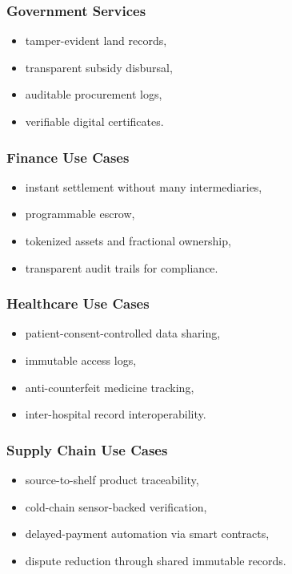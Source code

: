 \documentclass[12pt,a4paper]{article}
\begin{document}
\subsubsection*{Government Services}
\begin{itemize}
\item tamper-evident land records,
\item transparent subsidy disbursal,
\item auditable procurement logs,
\item verifiable digital certificates.
\end{itemize}

\subsubsection*{Finance Use Cases}
\begin{itemize}
\item instant settlement without many intermediaries,
\item programmable escrow,
\item tokenized assets and fractional ownership,
\item transparent audit trails for compliance.
\end{itemize}

\subsubsection*{Healthcare Use Cases}
\begin{itemize}
\item patient-consent-controlled data sharing,
\item immutable access logs,
\item anti-counterfeit medicine tracking,
\item inter-hospital record interoperability.
\end{itemize}

\subsubsection*{Supply Chain Use Cases}
\begin{itemize}
\item source-to-shelf product traceability,
\item cold-chain sensor-backed verification,
\item delayed-payment automation via smart contracts,
\item dispute reduction through shared immutable records.
\end{itemize}
\end{document}
